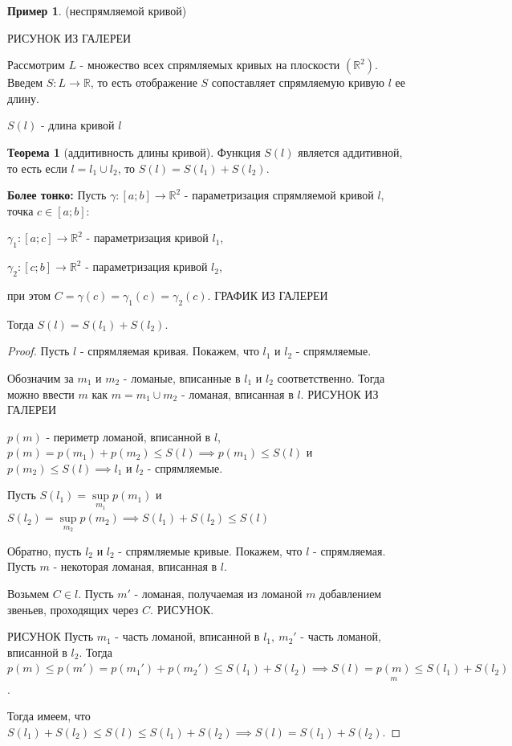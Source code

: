 \documentclass{report}
\theoremstyle{definition}
\newtheorem{example}{Пример}
\newtheorem{theorem}{Теорема}[section]
\begin{document}
\begin{example}
  (неспрямляемой кривой)

  {\Large РИСУНОК ИЗ ГАЛЕРЕИ}
\end{example}

Рассмотрим $L$ - множество всех спрямляемых кривых на плоскости $(\mathbb{R}^2)$.
Введем $S:L\rightarrow\mathbb{R}$, то есть отображение $S$ сопоставляет спрямляемую кривую $l$
ее длину.
\begin{center}
  $S(l)$ - длина кривой $l$
\end{center}

\begin{theorem}[аддитивность длины кривой]
  Функция $S(l)$ является аддитивной, то есть если $l = l_1 \cup l_2$, то $S(l) = S(l_1) + S(l_2)$.

  \textbf{Более тонко:} Пусть $\gamma:[a;b]\rightarrow\mathbb{R}^2$ - параметризация спрямляемой кривой
  $l$, точка $c \in [a;b]$:

  $\gamma_1:[a;c] \rightarrow \mathbb{R}^2$ - параметризация кривой $l_1$,

  $\gamma_2:[c;b] \rightarrow \mathbb{R}^2$ - параметризация кривой $l_2$,

  при этом $C = \gamma(c) = \gamma_1(c) = \gamma_2(c)$.
    {\Large ГРАФИК ИЗ ГАЛЕРЕИ}

  Тогда $S(l) = S(l_1) + S(l_2)$.
\end{theorem}

\begin{proof}
  Пусть $l$ - спрямляемая кривая. Покажем, что $l_1$ и $l_2$ - спрямляемые.

  Обозначим за $m_1$ и $m_2$ - ломаные, вписанные в $l_1$ и $l_2$ соответственно. Тогда можно ввести
  $m$ как $m = m_1 \cup m_2$ - ломаная, вписанная в $l$.
    {\Large РИСУНОК ИЗ ГАЛЕРЕИ}

  $p(m)$ - периметр ломаной, вписанной в $l$, $p(m) = p(m_1) + p(m_2) \leqslant S(l) \implies
    p(m_1)\leqslant S(l)$ и $p(m_2) \leqslant S(l) \implies l_1$ и $l_2$ - спрямляемые.

  Пусть $S(l_1) = \underset{m_1}{\sup} p(m_1)$ и $S(l_2) = \underset{m_2}{\sup} p(m_2) \implies
    S(l_1) + S(l_2) \leqslant S(l)$

  Обратно, пусть $l_2$ и $l_2$ - спрямляемые кривые. Покажем, что $l$ - спрямляемая. Пусть $m$
  - некоторая ломаная, вписанная в $l$.

  Возьмем $C \in l$. Пусть $m'$ - ломаная, получаемая из ломаной $m$ добавлением звеньев,
  проходящих через $C$. {\Large РИСУНОК}.

  {\Large РИСУНОК} Пусть $m_1$ - часть ломаной, вписанной в $l_1, \ m_2'$ - часть ломаной, вписанной
  в $l_2$. Тогда $p(m) \leqslant p(m') = p(m_1') + p(m_2') \leqslant S(l_1) + S(l_2) \implies
    S(l) = \underset{m}{p(m)} \leqslant S(l_1) + S(l_2)$.

  Тогда имеем, что $S(l_1) + S(l_2) \leqslant S(l) \leqslant S(l_1) + S(l_2) \implies S(l) =
    S(l_1) + S(l_2)$.
\end{proof}
\end{document}
